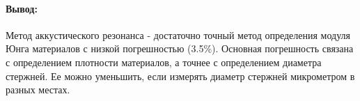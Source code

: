 \documentclass[a4paper, 10pt]{article}%
\begin{document}
	\paragraph {Вывод:}
		Метод аккустического резонанса - достаточно точный метод определения модуля Юнга материалов с низкой погрешностью (3.5\%). Основная погрешность связана с определением плотности материалов, а точнее с определением диаметра стержней. Ее можно уменьшить, если измерять диаметр стержней микрометром в разных местах.
\end{document}
